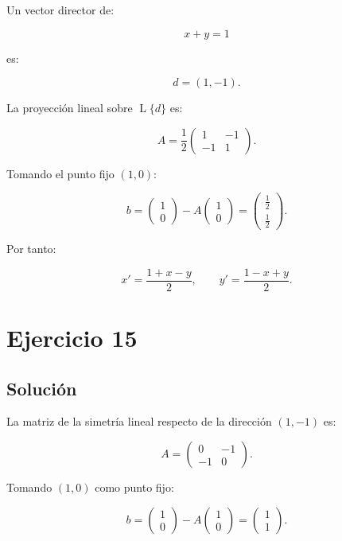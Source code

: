 \documentclass[11pt,a4paper]{article}
\newcommand{\Span}{\operatorname{L}}
\begin{document}
Un vector director de:

\[
x+y=1
\]

es:

\[
d=(1,-1).
\]

La proyección lineal sobre $\Span\{d\}$ es:

\[
A=
\frac12
\begin{pmatrix}
1&-1\\
-1&1
\end{pmatrix}.
\]

Tomando el punto fijo $(1,0)$:

\[
b=
\begin{pmatrix}
1\\0
\end{pmatrix}
-
A
\begin{pmatrix}
1\\0
\end{pmatrix}
=
\begin{pmatrix}
\frac12\\[1mm]
\frac12
\end{pmatrix}.
\]

Por tanto:

\[
\boxed{
x'=\frac{1+x-y}{2},
\qquad
y'=\frac{1-x+y}{2}.
}
\]

\section{Ejercicio 15}
\subsection{Solución}

La matriz de la simetría lineal respecto de la dirección $(1,-1)$ es:

\[
A=
\begin{pmatrix}
0&-1\\
-1&0
\end{pmatrix}.
\]

Tomando $(1,0)$ como punto fijo:

\[
b=
\begin{pmatrix}
1\\0
\end{pmatrix}
-
A
\begin{pmatrix}
1\\0
\end{pmatrix}
=
\begin{pmatrix}
1\\1
\end{pmatrix}.
\]
\end{document}
